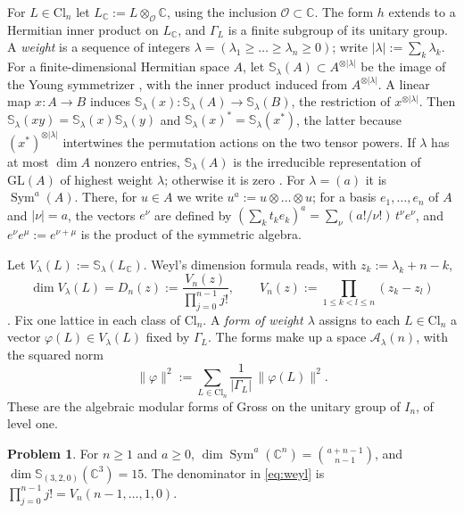 \documentclass[reqno]{amsart}
\theoremstyle{definition}
\newtheorem{problem}{Problem}[section]
\theoremstyle{plain}
\newcommand{\C}{\mathbb{C}}
\newcommand{\Oc}{\mathcal{O}}
\newcommand{\Sc}{\mathbb{S}}
\newcommand{\Ac}{\mathcal{A}}
\newcommand{\Cl}{\mathrm{Cl}}
\newcommand{\Sym}{\operatorname{Sym}}
\begin{document}
For \(L \in \Cl_n\) let \(L_\C := L \otimes_\Oc \C\), using the inclusion \(\Oc \subset \C\).  The form \(h\) extends to a Hermitian inner product on \(L_\C\), and \(\Gamma_L\) is a finite subgroup of its unitary group.  A \emph{weight} is a sequence of integers \(\lambda = (\lambda_1 \ge \dots \ge \lambda_n \ge 0)\); write \(\lvert \lambda \rvert := \sum_k \lambda_k\).  For a finite-dimensional Hermitian space \(A\), let \(\Sc_\lambda(A) \subset A^{\otimes \lvert \lambda \rvert}\) be the image of the Young symmetrizer \cite[\S6.1]{FH}, with the inner product induced from \(A^{\otimes \lvert\lambda\rvert}\).  A linear map \(x \colon A \to B\) induces \(\Sc_\lambda(x) \colon \Sc_\lambda(A) \to \Sc_\lambda(B)\), the restriction of \(x^{\otimes \lvert\lambda\rvert}\).  Then \(\Sc_\lambda(xy) = \Sc_\lambda(x)\Sc_\lambda(y)\) and \(\Sc_\lambda(x)^* = \Sc_\lambda(x^*)\), the latter because \((x^*)^{\otimes \lvert\lambda\rvert}\) intertwines the permutation actions on the two tensor powers.  If \(\lambda\) has at most \(\dim A\) nonzero entries, \(\Sc_\lambda(A)\) is the irreducible representation of \(\mathrm{GL}(A)\) of highest weight \(\lambda\); otherwise it is zero \cite[Theorem~6.3]{FH}.  For \(\lambda = (a)\) it is \(\Sym^a(A)\).  There, for \(u \in A\) we write \(u^a := u \otimes \dots \otimes u\); for a basis \(e_1, \dots, e_n\) of \(A\) and \(\lvert\nu\rvert = a\), the vectors \(e^\nu\) are defined by \((\sum_k t_k e_k)^a = \sum_\nu (a!/\nu!)\, t^\nu e^\nu\), and \(e^\nu e^\mu := e^{\nu+\mu}\) is the product of the symmetric algebra.

Let \(V_\lambda(L) := \Sc_\lambda(L_\C)\).  Weyl's dimension formula reads, with \(z_k := \lambda_k + n - k\),
\begin{equation}\label{eq:weyl}
  \dim V_\lambda(L) = D_n(z) := \frac{V_n(z)}{\prod_{j=0}^{n-1} j!},
  \qquad
  V_n(z) := \prod_{1 \le k < l \le n} (z_k - z_l)
\end{equation}
\cite[Eq.~(15.17)]{FH}.  Fix one lattice in each class of \(\Cl_n\).  A \emph{form of weight \(\lambda\)} assigns to each \(L \in \Cl_n\) a vector \(\varphi(L) \in V_\lambda(L)\) fixed by \(\Gamma_L\).  The forms make up a space \(\Ac_\lambda(n)\), with the squared norm
\[
  \lVert \varphi \rVert^2 := \sum_{L \in \Cl_n} \frac{1}{\lvert\Gamma_L\rvert}\, \lVert \varphi(L) \rVert^2 .
\]
These are the algebraic modular forms of Gross \cite{Gr} on the unitary group of \(I_n\), of level one.

\begin{problem}\label{pr:weyl}
For \(n\ge1\) and \(a\ge0\), \(\dim \Sym^a(\C^n) = \binom{a+n-1}{n-1}\), and \(\dim \Sc_{(3,2,0)}(\C^3) = 15\).  The denominator in \eqref{eq:weyl} is \(\prod_{j=0}^{n-1} j! = V_n(n-1, \dots, 1, 0)\).
\end{problem}
\end{document}
